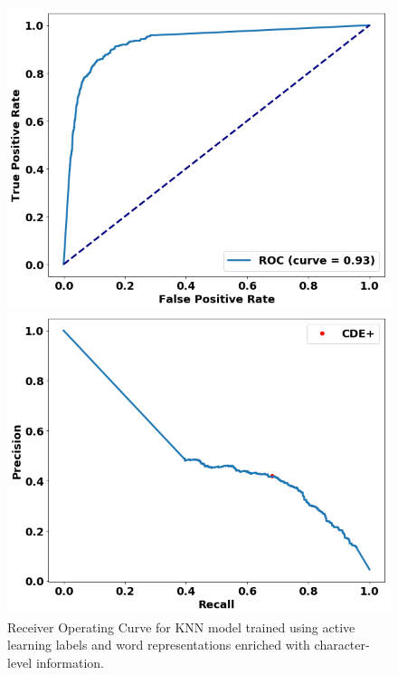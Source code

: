 
\begin{figure}
\centering
\begin{minipage}[b]{.4\textwidth}
\includegraphics[trim=0in 0.1in 0.1in 0.in,clip,width=1.0\textwidth]{figures/fasttext_roc_al_corpus_round5_100}
\caption{Receiver Operating Curve for KNN model trained using active learning labels and word representations enriched with character-level information.}\label{fig:al1_rocs_fasttext}
\end{minipage}\qquad
\begin{minipage}[b]{.4\textwidth}
\includegraphics[trim=0in 0.1in 0.1in 0.in,clip,width=1.0\textwidth]{figures/fasttext_prc_al_corpus_round5_100}

\end{minipage}
\end{figure}
